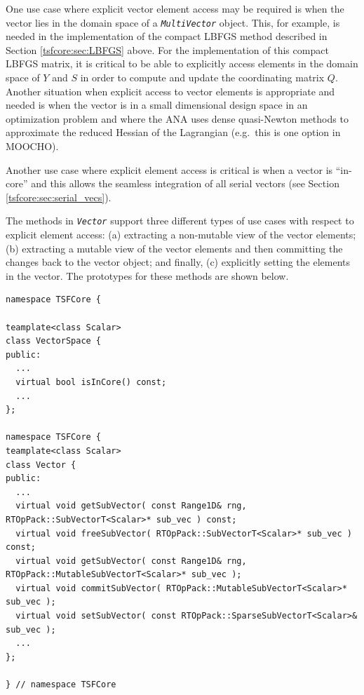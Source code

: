 One use case where explicit vector element access may be required is
when the vector lies in the domain space of a
{}\texttt{\textit{Multi\-Vector}} object.  This, for example, is
needed in the implementation of the compact LBFGS method described in
Section {}\ref{tsfcore:sec:LBFGS} above.  For the implementation of
this compact LBFGS matrix, it is critical to be able to explicitly
access elements in the domain space of $Y$ and $S$ in order to compute
and update the coordinating matrix $Q$.  Another situation when
explicit access to vector elements is appropriate and needed is when
the vector is in a small dimensional design space in an optimization
problem and where the ANA uses dense quasi-Newton methods to
approximate the reduced Hessian of the Lagrangian (e.g.~this is one
option in MOOCHO).

Another use case where explicit element access is critical is when a
vector is ``in-core'' and this allows the seamless integration of all
serial vectors (see Section {}\ref{tsfcore:sec:serial_vecs}).

The methods in {}\texttt{\textit{Vector}} support three different
types of use cases with respect to explicit element access: (a)
extracting a non-mutable view of the vector elements; (b) extracting a
mutable view of the vector elements and then committing the changes
back to the vector object; and finally, (c) explicitly setting the
elements in the vector.  The prototypes for these methods are shown
below.

{\scriptsize\begin{verbatim}
namespace TSFCore {

teamplate<class Scalar>
class VectorSpace {
public:
  ...
  virtual bool isInCore() const;
  ...
};

namespace TSFCore {
teamplate<class Scalar>
class Vector {
public:
  ...
  virtual void getSubVector( const Range1D& rng, RTOpPack::SubVectorT<Scalar>* sub_vec ) const;
  virtual void freeSubVector( RTOpPack::SubVectorT<Scalar>* sub_vec ) const;
  virtual void getSubVector( const Range1D& rng, RTOpPack::MutableSubVectorT<Scalar>* sub_vec );
  virtual void commitSubVector( RTOpPack::MutableSubVectorT<Scalar>* sub_vec );
  virtual void setSubVector( const RTOpPack::SparseSubVectorT<Scalar>& sub_vec );
  ...
};

} // namespace TSFCore
\end{verbatim}}

